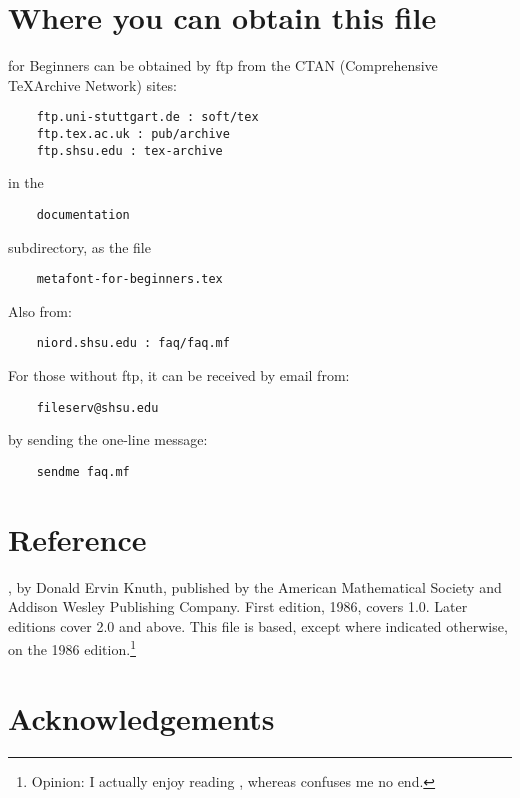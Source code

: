 \section*{Where you can obtain this file}%

\MF{} for Beginners can be obtained by ftp from the CTAN
(Comprehensive \TeX Archive Network) sites:
\begin{verbatim}
    ftp.uni-stuttgart.de : soft/tex
    ftp.tex.ac.uk : pub/archive
    ftp.shsu.edu : tex-archive
\end{verbatim}
in the
\begin{verbatim}
    documentation
\end{verbatim}
subdirectory, as the file
\begin{verbatim}
    metafont-for-beginners.tex
\end{verbatim}
Also from:
\begin{verbatim}
    niord.shsu.edu : faq/faq.mf
\end{verbatim}

For those without ftp, it can be received by email from:
\begin{verbatim}
    fileserv@shsu.edu
\end{verbatim}
by sending the one-line message:
\begin{verbatim}
    sendme faq.mf
\end{verbatim}


\section*{Reference}%

\MFbook{}, by Donald Ervin {\sc Knuth}, published by the
American Mathematical Society and Addison Wesley Publishing Company.
First edition, 1986, covers \MF{} 1.0.
Later editions cover \MF{} 2.0 and above.
This file is based, except where indicated otherwise,
on the 1986 edition.\footnote
{Opinion:  I actually enjoy reading \MFbook{},
whereas \TeXbook{} confuses me no end.}


\section*{Acknowledgements}%

